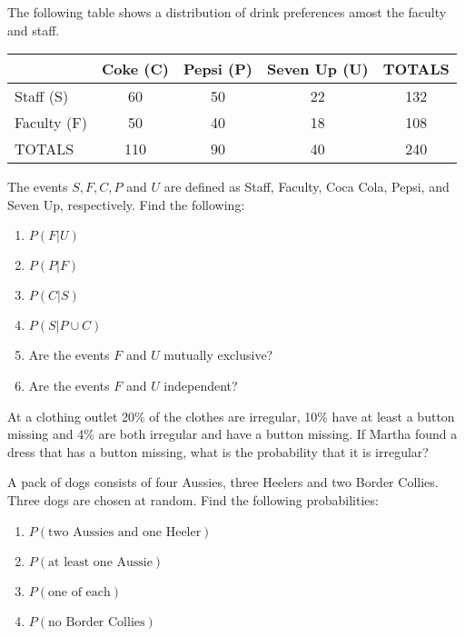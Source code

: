 \begin{puzzle}
    The following table shows a distribution of drink preferences amost the faculty and staff.

    \begin{center}
        \begin{tabular}{|l|c|c|c|c|}
            \hline
                        & Coke (C) & Pepsi (P) & Seven Up (U) & TOTALS \\
            \hline
            Staff (S)   & 60       & 50        & 22           & 132    \\
            Faculty (F) & 50       & 40        & 18           & 108    \\
            \hline
            TOTALS      & 110      & 90        & 40           & 240    \\
            \hline
        \end{tabular}
    \end{center}

    The events \( S, F, C, P \) and \( U \) are defined as Staff, Faculty, Coca Cola, Pepsi, and Seven Up, respectively. Find the following:
    \begin{enumerate}
        \item \( P(F | U) \)
        \item \( P(P | F) \)
        \item \( P(C | S) \)
        \item \( P(S | P \cup C) \)
        \item Are the events \( F \) and \( U \) mutually exclusive?
        \item Are the events \( F \) and \( U \) independent?
    \end{enumerate}
\end{puzzle}

\begin{puzzle}
    At a clothing outlet 20\% of the clothes are irregular, 10\% have at least a button missing and 4\% are both irregular and have a button missing. If Martha found a dress that has a button missing, what is the probability that it is irregular?
\end{puzzle}

\begin{puzzle}
    A pack of dogs consists of four Aussies, three Heelers and two Border Collies. Three dogs are chosen at random. Find the following probabilities:
    \begin{enumerate}
        \item \( P(\text{two Aussies and one Heeler}) \)
        \item \( P(\text{at least one Aussie}) \)
        \item \( P(\text{one of each}) \)
        \item\( P(\text{no Border Collies}) \)
    \end{enumerate}
\end{puzzle}

